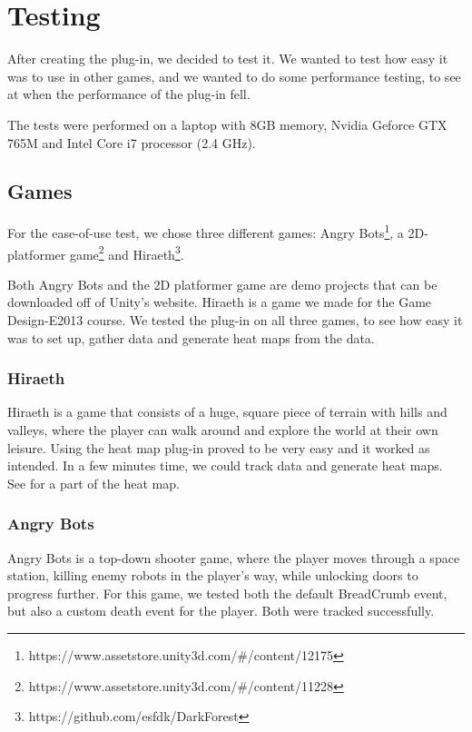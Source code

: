 \section{Testing}
\label{Testing}

After creating the plug-in, we decided to test it. We wanted to test how easy it was to use in other games, and we wanted to do some performance testing, to see at when the performance of the plug-in fell.

The tests were performed on a laptop with 8GB memory, Nvidia Geforce GTX 765M and Intel Core i7 processor (2.4 GHz).

\subsection{Games}
\label{Testing_Games}

For the ease-of-use test, we chose three different games: Angry Bots\footnote{https://www.assetstore.unity3d.com/\#/content/12175}, a 2D-platformer game\footnote{https://www.assetstore.unity3d.com/\#/content/11228} and Hiraeth\footnote{https://github.com/esfdk/DarkForest}.

Both Angry Bots and the 2D platformer game are demo projects that can be downloaded off of Unity's website. Hiraeth is a game we made for the Game Design-E2013 course. We tested the plug-in on all three games, to see how easy it was to set up, gather data and generate heat maps from the data.

\subsubsection{Hiraeth}
\label{Testing_Games_Hiraeth}

Hiraeth is a game that consists of a huge, square piece of terrain with hills and valleys, where the player can walk around and explore the world at their own leisure. Using the heat map plug-in proved to be very easy and it worked as intended. In a few minutes time, we could track data and generate heat maps. See  for a part of the heat map.


\subsubsection{Angry Bots}
\label{Testing_Games_AB}

Angry Bots is a top-down shooter game, where the player moves through a space station, killing enemy robots in the player's way, while unlocking doors to progress further. For this game, we tested both the default BreadCrumb event, but also a custom death event for the player. Both were tracked successfully.


